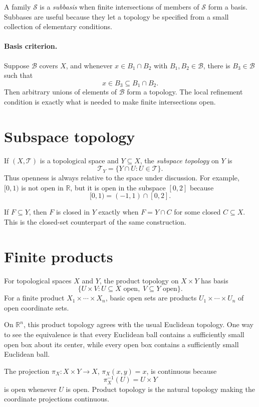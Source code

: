 A family \(\mathcal S\) is a \emph{subbasis} when finite intersections of members of \(\mathcal S\) form a basis. Subbases are useful because they let a topology be specified from a small collection of elementary conditions.

\paragraph{Basis criterion.}
Suppose \(\mathcal B\) covers \(X\), and whenever \(x\in B_1\cap B_2\) with \(B_1,B_2\in\mathcal B\), there is \(B_3\in\mathcal B\) such that
\[
x\in B_3\subseteq B_1\cap B_2.
\]
Then arbitrary unions of elements of \(\mathcal B\) form a topology. The local refinement condition is exactly what is needed to make finite intersections open.

\section{Subspace topology}
If \((X,\mathcal T)\) is a topological space and \(Y\subseteq X\), the \emph{subspace topology} on \(Y\) is
\[
\mathcal T_Y=\{Y\cap U:U\in\mathcal T\}.
\]
Thus openness is always relative to the space under discussion. For example, \([0,1)\) is not open in \(\mathbb R\), but it is open in the subspace \([0,2]\) because
\[
[0,1)=(-1,1)\cap[0,2].
\]

If \(F\subseteq Y\), then \(F\) is closed in \(Y\) exactly when \(F=Y\cap C\) for some closed \(C\subseteq X\). This is the closed-set counterpart of the same construction.

\section{Finite products}
For topological spaces \(X\) and \(Y\), the product topology on \(X\times Y\) has basis
\[
\{U\times V:U\subseteq X\text{ open},\;V\subseteq Y\text{ open}\}.
\]
For a finite product \(X_1\times\cdots\times X_n\), basic open sets are products \(U_1\times\cdots\times U_n\) of open coordinate sets.

On \(\mathbb R^n\), this product topology agrees with the usual Euclidean topology. One way to see the equivalence is that every Euclidean ball contains a sufficiently small open box about its center, while every open box contains a sufficiently small Euclidean ball.

\begin{example}
The projection \(\pi_X:X\times Y\to X\), \(\pi_X(x,y)=x\), is continuous because
\[
\pi_X^{-1}(U)=U\times Y
\]
is open whenever \(U\) is open. Product topology is the natural topology making the coordinate projections continuous.
\end{example}

